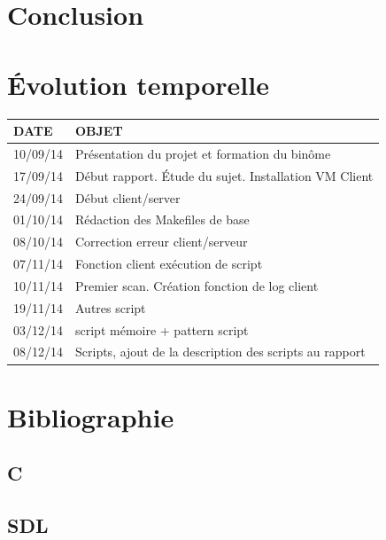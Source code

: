 \documentclass[11pt,a4paper,titlepage, oneside]{article}
\begin{document}
\section{{\color{red}Conclusion}}

\newpage
\section{{\color{red}Évolution temporelle}}
\begin{tabular}{|l|p{12cm}|}
	\hline
		
		\textbf{DATE}& \textbf{OBJET} \\
		
	\hline
		10/09/14 & Présentation du projet et formation du binôme\\
	\hline
		17/09/14 & Début rapport. Étude du sujet. Installation VM Client\\
	\hline
		24/09/14 & Début client/server\\
	\hline
		01/10/14 & Rédaction des Makefiles de base\\
	\hline
		08/10/14 & Correction erreur client/serveur\\
	\hline
		07/11/14 & Fonction client exécution de script\\
	\hline
		10/11/14 & Premier scan. Création fonction de log client\\
	\hline
		19/11/14 & Autres script\\
	\hline
		03/12/14 & script mémoire + pattern script\\
	\hline
		08/12/14 & Scripts, ajout de la description des scripts au rapport\\
	\hline
		
		

\end{tabular}
		



\newpage
\section{{\color{red}Bibliographie}}
	\subsection*{{\color{blue}C}}
		
	\subsection*{{\color{blue}SDL}}
		\paragraph{}
			
\end{document}
